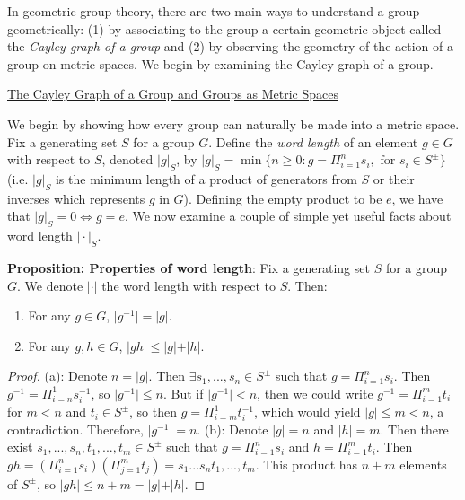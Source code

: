 \documentclass[12pt]{article}
\newcommand{\vs}{\vskip10pt}
\begin{document}
	In geometric group theory, there are two main ways to understand a group geometrically: (1) by associating to the group a certain geometric object called the \textit{Cayley graph of a group} and (2) by observing the geometry of the action of a group on metric spaces. We begin by examining the Cayley graph of a group. 
	
	\vs 
	
	\underline{The Cayley Graph of a Group and Groups as Metric Spaces}
	
	\vs 
	
	We begin by showing how every group can naturally be made into a metric space. Fix a generating set $S$ for a group $G$. Define the \textit{word length} of an element $g \in G$ with respect to $S$, denoted $\vert g \vert_S$, by $\vert g \vert_S = \min \{n \geq 0: g = \Pi_{i=1}^n s_i, \text{ for } s_i \in S^{\pm}\}$ (i.e. $\vert g \vert_S$ is the minimum length of a product of generators from $S$ or their inverses which represents $g$ in $G$). Defining the empty product to be $e$, we have that $\vert g \vert_S = 0 \iff g = e$. We now examine a couple of simple yet useful facts about word length $\vert \cdot \vert_S$. 
	
		\vs 
	
	\textbf{Proposition: Properties of word length}: Fix a generating set $S$ for a group $G$. We denote $\vert \cdot \vert$ the word length with respect to $S$. Then: 
	
	\begin{enumerate}[label = (\alph*)]
		\item For any $g \in G$, $\vert g^{-1} \vert = \vert g \vert$. 
		\item For any $g,h \in G$, $\vert gh \vert \leq \vert g \vert + \vert h \vert$.
	\end{enumerate}
	
	\begin{proof}
		
		(a): Denote $n = \vert g \vert$. Then $\exists s_1,...,s_n \in S^{\pm}$ such that $g = \Pi_{i=1}^n s_i$. Then $g^{-1} = \Pi_{i=n}^{1} s_i^{-1}$, so $\vert g^{-1} \vert \leq n$. But if $\vert g^{-1} \vert < n$, then we could write $g^{-1} = \Pi_{i = 1}^m t_i$ for $m < n$ and $t_i \in S^{\pm}$, so then $g = \Pi_{i = m}^1 t_i^{-1}$, which would yield $\vert g \vert \leq m < n$, a contradiction. Therefore, $\vert g^{-1} \vert = n$. 
		\vs 
		(b): Denote $\vert g \vert = n$ and $\vert h \vert = m$. Then there exist $s_1,...,s_n,t_1,...,t_m \in S^{\pm}$ such that $g = \Pi_{i=1}^n s_i$ and $h = \Pi_{i=1}^m t_i$. Then $gh = (\Pi_{i=1}^n s_i)(\Pi_{j=1}^m t_j) = s_1...s_nt_1,...,t_m$. This product has $n+m$ elements of $S^{\pm}$, so $\vert gh \vert \leq n + m = \vert g \vert + \vert h \vert$.
		
	\end{proof}
	
\end{document}
